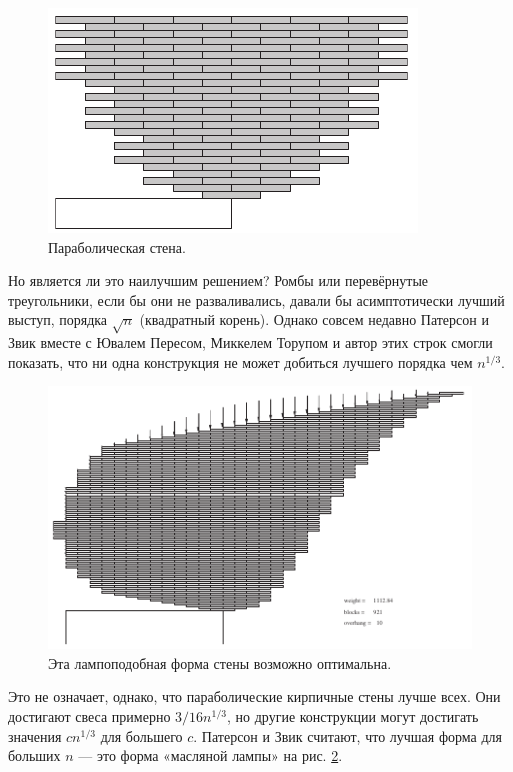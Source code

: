 \begin{figure}[htb!]
\centering
\includegraphics[scale=1]{pics/kirpich7}
\caption{Параболическая стена.}
\label{pic:kirpich7}
\end{figure}

Но является ли это наилучшим решением?
Ромбы или перевёрнутые треугольники, если бы они не разваливались, давали бы асимптотически лучший выступ, порядка $\sqrt{n}$ (квадратный корень).
Однако совсем недавно Патерсон и Звик вместе с Ювалем Пересом, Миккелем Торупом и автор этих строк \cite{48} смогли показать, что ни одна конструкция не может добиться лучшего порядка чем $n^{1/3}$.

\begin{figure}[htb!]
\centering
\includegraphics[scale=1]{pics/kirpich8}
\caption{Эта лампоподобная форма стены возможно оптимальна.}
\label{pic:kirpich8}
\end{figure}

Это не означает, однако, что параболические кирпичные стены лучше всех.
Они достигают свеса примерно $3/16n^{1/3}$, но другие конструкции могут достигать значения $cn^{1/3}$ для большего $c$.
Патерсон и Звик считают, что лучшая форма для больших $n$ --- это форма «масляной лампы» на рис. \ref{pic:kirpich8}.

